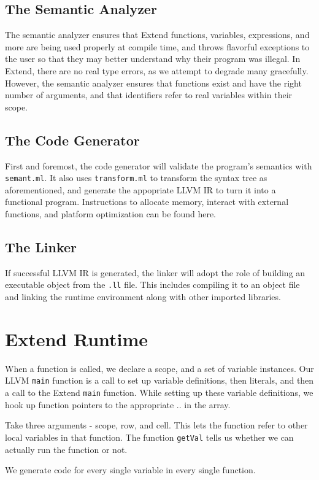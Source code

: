   \subsection{The Semantic Analyzer}
  The semantic analyzer ensures that Extend functions, variables, expressions, and more are being used properly at compile time, and throws flavorful exceptions to the user so that they may better understand why their program was illegal. In Extend, there are no real type errors, as we attempt to degrade many gracefully. However, the semantic analyzer ensures that functions exist and have the right number of arguments, and that identifiers refer to real variables within their scope.

  \subsection{The Code Generator}
  First and foremost, the code generator will validate the program's semantics with \texttt{semant.ml}. It also uses \texttt{transform.ml} to transform the syntax tree as aforementioned, and generate the appopriate LLVM IR to turn it into a functional program. Instructions to allocate memory, interact with external functions, and platform optimization can be found here.

  \subsection{The Linker}
  If successful LLVM IR is generated, the linker will adopt the role of building an executable object from the \texttt{.ll} file. This includes compiling it to an object file and linking the runtime environment along with other imported libraries.

  \section{Extend Runtime}
  When a function is called, we declare a scope, and a set of variable instances. Our LLVM \texttt{main} function is a call to set up variable definitions, then literals, and then a call to the Extend \texttt{main} function. While setting up these variable definitions, we hook up function pointers to the appropriate .. in the array.

  \medskip \noindent
  Take three arguments - scope, row, and cell. This lets the function refer to other local variables in that function. The function \texttt{getVal} tells us whether we can actually run the function or not.

  \medskip \noindent
  We generate code for every single variable in every single function.
